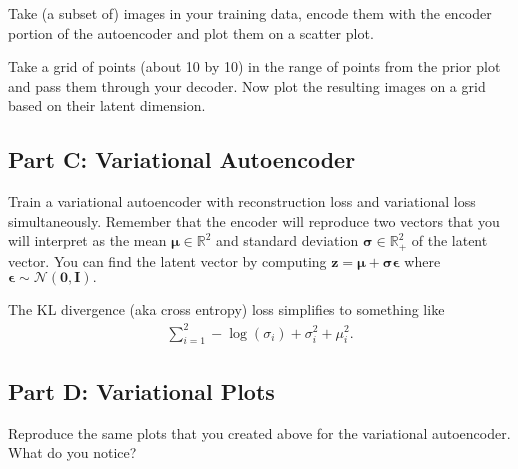 \documentclass{article}
\begin{document}
Take (a subset of) images in your training data, encode them with the encoder portion of the autoencoder and plot them on a scatter plot.

Take a grid of points (about 10 by 10) in the range of points from the prior plot and pass them through your decoder.
Now plot the resulting images on a grid based on their latent dimension.

\subsection*{Part C: Variational Autoencoder}

Train a variational autoencoder with reconstruction loss and variational loss simultaneously.
Remember that the encoder will reproduce two vectors that you will interpret as the mean $\bm{\mu} \in \mathbb{R}^2$ and standard deviation $\bm{\sigma} \in \mathbb{R}_+^2$ of the latent vector.
You can find the latent vector by computing $\mathbf{z} = \bm{\mu} + \bm{\sigma} \bm{\epsilon}$ where $\bm{\epsilon} \sim \mathcal{N}(\bm{0}, \bm{I}).$

The KL divergence (aka cross entropy) loss simplifies to something like
\begin{align}
    \sum_{i=1}^2 -\log(\sigma_i) + \sigma_i^2 + \mu_i^2.
\end{align}

\subsection*{Part D: Variational Plots}

Reproduce the same plots that you created above for the variational autoencoder.
What do you notice?

%
\end{document}
